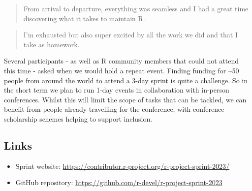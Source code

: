 \begin{quote}
From arrival to departure, everything was seamless and I had a great time discovering what it takes to maintain R.
\end{quote}

\begin{quote}
I'm exhausted but also super excited by all the work we did and that I take as homework.
\end{quote}

Several participants - as well as R community members that could not attend this time - asked when we would hold a repeat event. Finding funding for \textasciitilde50 people from around the world to attend a 3-day sprint is quite a challenge. So in the short term we plan to run 1-day events in collaboration with in-person conferences. Whilst this will limit the scope of tasks that can be tackled, we can benefit from people already travelling for the conference, with conference scholarship schemes helping to support inclusion.

\hypertarget{links}{%
\subsection{Links}\label{links}}

\begin{itemize}
\tightlist
\item
  Sprint website: \url{https://contributor.r-project.org/r-project-sprint-2023/}
\item
  GitHub repository: \url{https://github.com/r-devel/r-project-sprint-2023}
\end{itemize}


\address{%
Heather Turner\\
University of Warwick\\%
Coventry, United Kingdom\\
%
\url{https://warwick.ac.uk/heatherturner}\\%
\textit{ORCiD: \href{https://orcid.org/0000-0002-1256-3375}{0000-0002-1256-3375}}\\%
\href{mailto:h.turner.1@warwick.ac.uk}{\nolinkurl{h.turner.1@warwick.ac.uk}}%
}

\address{%
Gabriel Becker\\
Independent consultant\\%
San Francisco, USA\\
%
%
%
\href{mailto:gabembecker@gmail.com}{\nolinkurl{gabembecker@gmail.com}}%
}
